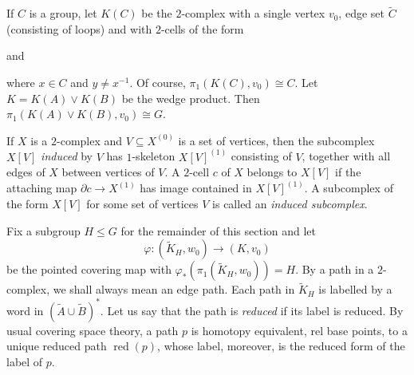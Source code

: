 \documentclass[11pt,reqno]{amsart}
\begin{document}
If $C$ is a group, let $K(C)$ be the $2$-complex with a single vertex $v_0$, edge set ${\ensuremath{\widetilde {C}}}$ (consisting of loops) and with $2$-cells of the form
\begin{center}\qquad\quad and\qquad\quad
{}
\end{center}
where $x\in C$ and $y\neq x{^{-1}}$.
Of course, $\pi_1(K(C),v_0)\cong C$.  Let $K=K(A)\vee K(B)$ be the wedge product.  Then $\pi_1(K(A)\vee K(B),v_0)\cong G$.

If $X$ is a $2$-complex and $V\subseteq X^{(0)}$ is a set of vertices, then the subcomplex $X[V]$ \emph{induced} by $V$ has $1$-skeleton $X[V]^{(1)}$ consisting of $V$, together with all edges of $X$ between vertices of $V$.  A $2$-cell $c$ of $X$ belongs to $X[V]$ if the attaching map $\partial c{\rightarrow} X^{(1)}$ has image contained in $X[V]^{(1)}$. A subcomplex of the form $X[V]$ for some set of vertices $V$ is called an \emph{induced subcomplex}.

Fix a subgroup $H\leq G$ for the remainder of this section and let \[{\varphi}\colon ({\ensuremath{\widetilde {K}}}_H,w_0){\rightarrow} (K,v_0)\] be the pointed covering map with ${\varphi}_*(\pi_1({\ensuremath{\widetilde {K}}}_H,w_0))=H$. By a path in a $2$-complex, we shall always mean an edge path. Each path in ${\ensuremath{\widetilde {K}}}_H$ is labelled by a word in $({\ensuremath{\widetilde {A}}}\cup {\ensuremath{\widetilde {B}}})^*$.  Let us say that the path is \emph{reduced} if its label is reduced. By usual covering space theory, a path $p$ is homotopy equivalent, rel base points, to a unique reduced path ${\mathop{\mathrm{red}}\nolimits}(p)$, whose label, moreover, is the reduced form of the label of $p$.
\end{document}
